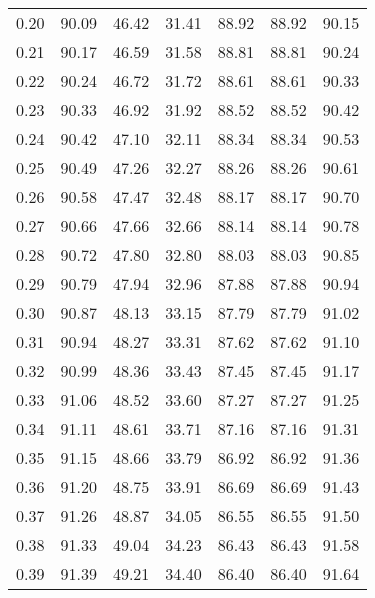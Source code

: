 \begin{tabular}{|c|c|c|c|c|c|c|}
      0.20 &     90.09 &     46.42 &      31.41 &   88.92 &      88.92 &         90.15 \\
      0.21 &     90.17 &     46.59 &      31.58 &   88.81 &      88.81 &         90.24 \\
      0.22 &     90.24 &     46.72 &      31.72 &   88.61 &      88.61 &         90.33 \\
      0.23 &     90.33 &     46.92 &      31.92 &   88.52 &      88.52 &         90.42 \\
      0.24 &     90.42 &     47.10 &      32.11 &   88.34 &      88.34 &         90.53 \\
      0.25 &     90.49 &     47.26 &      32.27 &   88.26 &      88.26 &         90.61 \\
      0.26 &     90.58 &     47.47 &      32.48 &   88.17 &      88.17 &         90.70 \\
      0.27 &     90.66 &     47.66 &      32.66 &   88.14 &      88.14 &         90.78 \\
      0.28 &     90.72 &     47.80 &      32.80 &   88.03 &      88.03 &         90.85 \\
      0.29 &     90.79 &     47.94 &      32.96 &   87.88 &      87.88 &         90.94 \\
      0.30 &     90.87 &     48.13 &      33.15 &   87.79 &      87.79 &         91.02 \\
      0.31 &     90.94 &     48.27 &      33.31 &   87.62 &      87.62 &         91.10 \\
      0.32 &     90.99 &     48.36 &      33.43 &   87.45 &      87.45 &         91.17 \\
      0.33 &     91.06 &     48.52 &      33.60 &   87.27 &      87.27 &         91.25 \\
      0.34 &     91.11 &     48.61 &      33.71 &   87.16 &      87.16 &         91.31 \\
      0.35 &     91.15 &     48.66 &      33.79 &   86.92 &      86.92 &         91.36 \\
      0.36 &     91.20 &     48.75 &      33.91 &   86.69 &      86.69 &         91.43 \\
      0.37 &     91.26 &     48.87 &      34.05 &   86.55 &      86.55 &         91.50 \\
      0.38 &     91.33 &     49.04 &      34.23 &   86.43 &      86.43 &         91.58 \\
      0.39 &     91.39 &     49.21 &      34.40 &   86.40 &      86.40 &         91.64 \\

\end{tabular}

